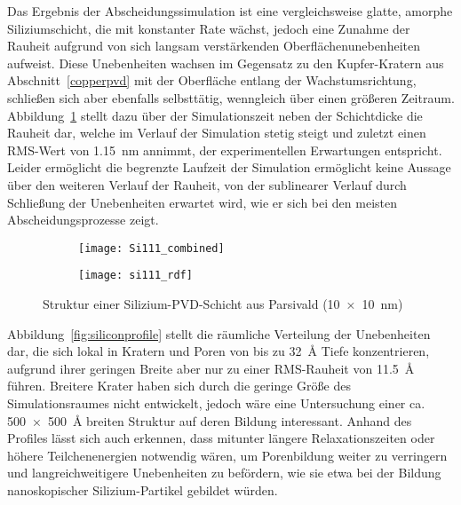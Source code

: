 Das Ergebnis der Abscheidungssimulation ist eine vergleichsweise glatte, amorphe Siliziumschicht, die mit konstanter Rate wächst, jedoch eine Zunahme der Rauheit aufgrund von sich langsam verstärkenden Oberflächenunebenheiten aufweist.
Diese Unebenheiten wachsen im Gegensatz zu den Kupfer-Kratern aus Abschnitt~\ref{copperpvd} mit der Oberfläche entlang der Wachstumsrichtung, schließen sich aber ebenfalls selbsttätig, wenngleich über einen größeren Zeitraum.
Abbildung~\ref{fig:siliconresults-a} stellt dazu über der Simulationszeit neben der Schichtdicke die Rauheit dar, welche im Verlauf der Simulation stetig steigt und zuletzt einen RMS-Wert von \SI{1.15}{\nano\meter} annimmt, der experimentellen Erwartungen entspricht.
Leider ermöglicht die begrenzte Laufzeit der Simulation ermöglicht keine Aussage über den weiteren Verlauf der Rauheit, von der sublinearer Verlauf durch Schließung der Unebenheiten erwartet wird, wie er sich bei den meisten Abscheidungsprozesse zeigt.

\begin{figure}
  \captionsetup[subfigure]{singlelinecheck=false}
  \def\subfigwidth{0.48\textwidth}
  \begin{subfigure}[t]{\subfigwidth}
    \texttt{[image: Si111\_combined]}
    \label{fig:siliconresults-a}
  \end{subfigure}
  \hfill
  \begin{subfigure}[t]{\subfigwidth}
    \texttt{[image: si111\_rdf]}
    \label{fig:siliconresults-b}
  \end{subfigure}
  \caption[Struktur einer Silizium-PVD-Schicht aus Parsivald]{
    Struktur einer Silizium-PVD-Schicht aus Parsivald (\SI{10x10}{\nano\meter})
  }
  \label{fig:siliconresults}
\end{figure}

Abbildung~\ref{fig:siliconprofile} stellt die räumliche Verteilung der Unebenheiten dar, die sich lokal in Kratern und Poren von bis zu \SI{32}{\angstrom} Tiefe konzentrieren, aufgrund ihrer geringen Breite aber nur zu einer RMS-Rauheit von \SI{11.5}{\angstrom} führen.
Breitere Krater haben sich durch die geringe Größe des Simulationsraumes nicht entwickelt, jedoch wäre eine Untersuchung einer ca. \SI{500x500}{\angstrom} breiten Struktur auf deren Bildung interessant.
Anhand des Profiles lässt sich auch erkennen, dass mitunter längere Relaxationszeiten oder höhere Teilchenenergien notwendig wären, um Porenbildung weiter zu verringern und langreichweitigere Unebenheiten zu befördern, wie sie etwa bei der Bildung nanoskopischer Silizium-Partikel gebildet würden.

